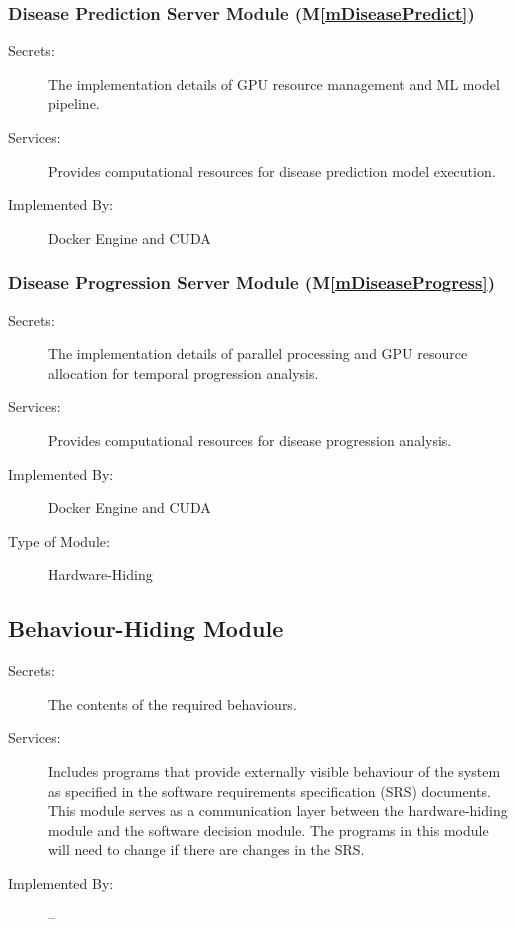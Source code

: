 \documentclass[12pt, titlepage]{article}
\newcommand{\mref}[1]{M\ref{#1}}
\begin{document}
\subsubsection{Disease Prediction Server Module (\mref{mDiseasePredict})}
\begin{description}
\item[Secrets:] The implementation details of GPU resource management and ML model pipeline.
\item[Services:] Provides computational resources for disease prediction model execution.
\item[Implemented By:] Docker Engine and CUDA
\end{description}

\subsubsection{Disease Progression Server Module (\mref{mDiseaseProgress})}
\begin{description}
\item[Secrets:] The implementation details of parallel processing and GPU resource allocation for temporal progression analysis.
\item[Services:] Provides computational resources for disease progression analysis.
\item[Implemented By:] Docker Engine and CUDA
\item[Type of Module:] Hardware-Hiding
\end{description}

\subsection{Behaviour-Hiding Module}

\begin{description}
\item[Secrets:]The contents of the required behaviours.
\item[Services:]Includes programs that provide externally visible behaviour of
  the system as specified in the software requirements specification (SRS)
  documents. This module serves as a communication layer between the
  hardware-hiding module and the software decision module. The programs in this
  module will need to change if there are changes in the SRS.
\item[Implemented By:] --
\end{description}
\end{document}
